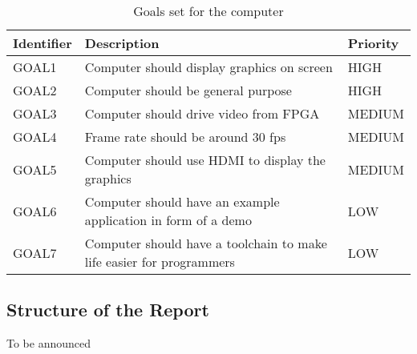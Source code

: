 \begin{table}[h]
    \centering
    \begin{tabular}{|l|l|l|}
        \hline
        \textbf{Identifier}           & \textbf{Description}                & \textbf{Priority} \\ \hline
        GOAL1  & Computer should display graphics on screen                           & HIGH    \\ \hline
        GOAL2  & Computer should be general purpose                                   & HIGH    \\ \hline
        GOAL3  & Computer should drive video from FPGA                                & MEDIUM  \\ \hline
        GOAL4  & Frame rate should be around 30 fps                                   & MEDIUM  \\ \hline
        GOAL5  & Computer should use HDMI to display the graphics                     & MEDIUM  \\ \hline
        GOAL6  & Computer should have an example application in form of a demo        & LOW     \\ \hline
        GOAL7  & Computer should have a toolchain to make life easier for programmers & LOW     \\ \hline
    \end{tabular}
    \caption{Goals set for the computer}
    \label{tab:goals}
\end{table}

\subsection{Structure of the Report}

To be announced
